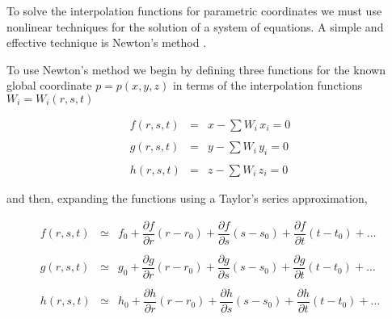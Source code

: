 To solve the interpolation functions for parametric coordinates we must use nonlinear techniques for the solution of a system of equations. A simple and effective technique is Newton's method \cite{Conte72}.

To use Newton's method we begin by defining three functions for the known global coordinate $p = p(x,y,z)$ in terms of the interpolation functions $W_i = W_i(r,s,t)$

\begin{equation}\label{eq:8.10}
\begin{array}{lll}
f(r, s, t) &=& x - \sum W_i \, x_i = 0 \\ \\
g(r, s, t) &=& y - \sum W_i \, y_i = 0 \\ \\
h(r, s, t) &=& z - \sum W_i \, z_i = 0
\end{array}
\end{equation}

and then, expanding the functions using a Taylor's series approximation,

\begin{equation}\label{eq:8.11}
\begin{array}{lll}
f(r, s, t) &\simeq& f_0
  + \dfrac{\partial f}{\partial r}(r - r_0)
  + \dfrac{\partial f}{\partial s}(s - s_0)
  + \dfrac{\partial f}{\partial t}(t - t_0) + \ldots \\ \\
g(r, s, t) &\simeq& g_0
  + \dfrac{\partial g}{\partial r}(r - r_0)
  + \dfrac{\partial g}{\partial s}(s - s_0)
  + \dfrac{\partial g}{\partial t}(t - t_0) + \ldots \\ \\
h(r, s, t) &\simeq& h_0
  + \dfrac{\partial h}{\partial r}(r - r_0)
  + \dfrac{\partial h}{\partial s}(s - s_0)
  + \dfrac{\partial h}{\partial t}(t - t_0) + \ldots
\end{array}
\end{equation}

